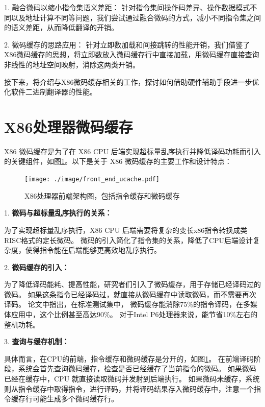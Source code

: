 1. 融合微码以缩小指令集语义差距： 针对指令集间操作码差异、操作数据模式不同以及地址计算不同等问题，我们尝试通过融合微码的方式，减小不同指令集之间的语义差距，从而降低翻译的开销。

2. 微码缓存的思路应用： 针对立即数加载和间接跳转的性能开销，我们借鉴了X86微码缓存的思想，将立即数放入微码缓存行中直接加载，用微码缓存直接查询非线性的地址空间映射，消除这两类开销。

接下来，将介绍与X86微码缓存相关的工作，探讨如何借助硬件辅助手段进一步优化软件二进制翻译器的性能。


\section{X86处理器微码缓存}\label{sec:complex_isa}

X86 微码缓存是为了在 X86 CPU 后端实现超标量乱序执行并降低译码功耗而引入的关键组件\cite{solomonMicrooperationCachePower2001}，如图\ref{img:front_end_ucache}。以下是关于 X86 微码缓存的主要工作和设计特点：

\begin{figure}[!htbp]
  \centering
  \texttt{[image: ./image/front\_end\_ucache.pdf]}
  \caption{X86处理器前端架构图，包括指令缓存和微码缓存}
  \label{img:front_end_ucache}
\end{figure}


1. \textbf{微码与超标量乱序执行的关系：}

为了实现超标量乱序执行，X86 CPU 后端需要将复杂的变长x86指令转换成类RISC格式的定长微码。
微码的引入简化了指令集的关系，降低了CPU后端设计复杂度，使得指令能在后端能够更高效地乱序执行。

2. \textbf{微码缓存的引入：}

为了降低译码能耗、提高性能，研究者们引入了微码缓存，用于存储已经译码过的微码。
如果这条指令已经译码过，就直接从微码缓存中读取微码，而不需要再次译码。
\cite{solomonMicrooperationCachePower2001}论文中指出，在标准测试集中，
微码缓存能消除75\%的指令译码，在多媒体应用中，这个比例甚至高达90\%。
对于Intel P6处理器来说，能节省10\%左右的整机功耗。

3. \textbf{查询与缓存机制：}

具体而言，在CPU的前端，指令缓存和微码缓存是分开的，如图\ref{img:front_end_ucache}。
在前端译码阶段，系统会首先查询微码缓存，检查是否已经缓存了当前指令的微码。
如果微码已经在缓存中，CPU 就直接读取微码并发射到后端执行。
如果微码未缓存，系统则从指令缓存中取得指令，进行译码，并将译码结果存入微码缓存中，注意一个指令缓存行可能生成多个微码缓存行。


